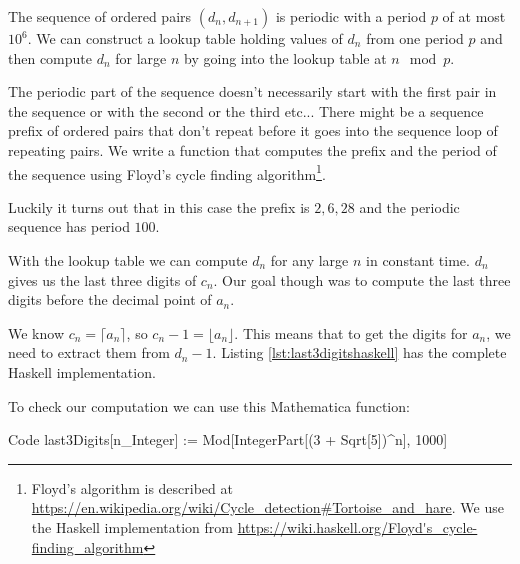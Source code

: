 The sequence of ordered pairs $(d_n, d_{n+1})$ is periodic with a period $p$ of at most $10^6$. We can construct a lookup table holding values of $d_n$ from one period $p$ and then compute $d_n$ for large $n$ by going into the lookup table at $n \mod{p}$.

The periodic part of the sequence doesn't necessarily start with the first pair in the sequence or with the second or the third etc... There might be a sequence prefix of ordered pairs that don't repeat before it goes into the sequence loop of repeating pairs. 
{}
We write a function that computes the prefix and the period of the sequence using Floyd's cycle finding algorithm\footnote{Floyd's algorithm is described at \url{https://en.wikipedia.org/wiki/Cycle_detection\#Tortoise_and_hare}. We use the Haskell implementation from \url{https://wiki.haskell.org/Floyd's_cycle-finding_algorithm}}. 

Luckily it turns out that in this case the prefix is  $2, 6, 28$  and the periodic sequence has period $100$.

With the lookup table we can compute $d_n$ for any large $n$ in constant time. $d_n$ gives us the last three digits of $c_n$. Our goal though was to compute the last three digits before the decimal point of $a_n$.  

We know $c_n=\lceil a_n \rceil$, so $c_n - 1=\lfloor a_n \rfloor$. This means that to get the digits for $a_n$, we need to extract them from $d_n - 1$. Listing \ref{lst:last3digitshaskell} has the complete Haskell implementation.

\begin{fullwidth}



To check our computation we can use this Mathematica function:

\begin{mmaCell}[morepattern={n, n_Integer}]{Code}
  last3Digits[n_Integer] := Mod[IntegerPart[(3 + Sqrt[5])^n], 1000]
\end{mmaCell}

\end{fullwidth}






 